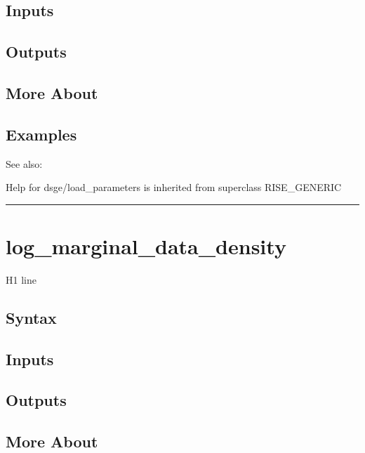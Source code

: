 \documentclass[letterpaper,10pt,english]{sphinxmanual}
\begin{document}
\subsection{Inputs}
\label{classes/models/@dsge/dsge:id88}

\subsection{Outputs}
\label{classes/models/@dsge/dsge:id89}

\subsection{More About}
\label{classes/models/@dsge/dsge:id90}

\subsection{Examples}
\label{classes/models/@dsge/dsge:id91}
See also:

Help for dsge/load\_parameters is inherited from superclass RISE\_GENERIC


\bigskip\hrule{}\bigskip



\section{log\_marginal\_data\_density}
\label{classes/models/@dsge/dsge:id92}\label{classes/models/@dsge/dsge:log-marginal-data-density}
H1 line


\subsection{Syntax}
\label{classes/models/@dsge/dsge:id93}

\subsection{Inputs}
\label{classes/models/@dsge/dsge:id94}

\subsection{Outputs}
\label{classes/models/@dsge/dsge:id95}

\subsection{More About}
\label{classes/models/@dsge/dsge:id96}
\end{document}

